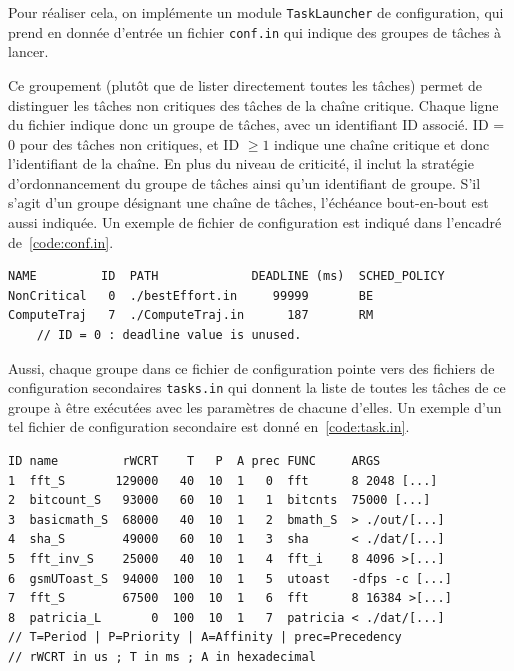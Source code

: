 \documentclass[french, a4paper, 11pt, twoside, pdftex]{StyleThese}
\begin{document}
	Pour réaliser cela, on implémente un module \texttt{TaskLauncher} de configuration, qui prend en donnée d'entrée un fichier \texttt{conf.in} qui indique des groupes de tâches à lancer. 
	
	Ce groupement (plutôt que de lister directement toutes les tâches) permet de distinguer les tâches non critiques des tâches de la chaîne critique. Chaque ligne du fichier indique donc un groupe de tâches, avec un identifiant ID associé. ID = 0 pour des tâches non critiques, et ID $ \geq1 $ indique une chaîne critique et donc l'identifiant de la chaîne.
	En plus du niveau de criticité, il inclut la stratégie d'ordonnancement du groupe de tâches ainsi qu'un identifiant de groupe. S'il s'agit d'un groupe désignant une chaîne de tâches, l'échéance bout-en-bout est aussi indiquée. Un exemple de fichier de configuration est indiqué dans l'encadré de~\autoref{code:conf.in}.
	
\begin{lstlisting}[caption={Exemple type de fichier d'entrée conf.in}, label={code:conf.in}]
NAME         ID  PATH             DEADLINE (ms)  SCHED_POLICY
NonCritical   0  ./bestEffort.in     99999       BE
ComputeTraj   7  ./ComputeTraj.in      187       RM
	// ID = 0 : deadline value is unused.
\end{lstlisting}

	Aussi, chaque groupe dans ce fichier de configuration pointe vers des fichiers de configuration secondaires \texttt{tasks.in} qui donnent la liste de toutes les tâches de ce groupe à être exécutées avec les paramètres de chacune d'elles. Un exemple d'un tel fichier de configuration secondaire est donné en~\autoref{code:task.in}.
	
	\begin{lstlisting}[caption={Fichier d'entrée pour une chaine de tâche}, label={code:task.in}]
ID name         rWCRT    T   P  A prec FUNC     ARGS
1  fft_S       129000   40  10  1   0  fft      8 2048 [...]
2  bitcount_S   93000   60  10  1   1  bitcnts  75000 [...]
3  basicmath_S  68000   40  10  1   2  bmath_S  > ./out/[...]
4  sha_S        49000   60  10  1   3  sha      < ./dat/[...]
5  fft_inv_S    25000   40  10  1   4  fft_i    8 4096 >[...]
6  gsmUToast_S  94000  100  10  1   5  utoast   -dfps -c [...]
7  fft_S        67500  100  10  1   6  fft      8 16384 >[...]
8  patricia_L       0  100  10  1   7  patricia < ./dat/[...]
// T=Period | P=Priority | A=Affinity | prec=Precedency
// rWCRT in us ; T in ms ; A in hexadecimal
\end{lstlisting} %
	
\end{document}
